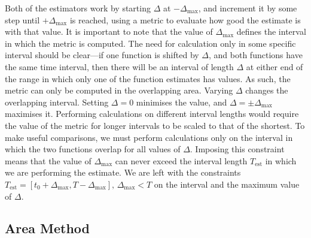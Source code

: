 \documentclass[a4paper,11pt]{article}
\begin{document}
  Both of the estimators work by starting $\Delta$ at $-\Delta_{\text{max}}$,
  and increment it by some step until $+\Delta_{\text{max}}$ is reached,
  using a metric to evaluate how good the estimate is with that value. It is
  important to note that the value of $\Delta_{\text{max}}$ defines the interval
  in which the metric is computed. The need for calculation only in some
  specific interval should be clear---if one function is shifted by $\Delta$,
  and both functions have the same time interval, then there will be an interval
  of length $\Delta$ at either end of the range in which only one of the
  function estimates has values. As such, the metric can only be computed in the
  overlapping area. Varying $\Delta$ changes the overlapping interval. Setting
  $\Delta=0$ minimises the value, and $\Delta=\pm\Delta_{\text{max}}$ maximises
  it. Performing calculations on different interval lengths would require the
  value of the metric for longer intervals to be scaled to that of the
  shortest. To make useful comparisons, we must perform calculations only on the
  interval in which the two functions overlap for all values of
  $\Delta$. Imposing this constraint means that the value of
  $\Delta_{\text{max}}$ can never exceed the interval length $T_{\text{est}}$ in which we are
  performing the estimate. We are left with the constraints
  $T_{\text{est}}=[t_0+\Delta_{\text{max}},
  T-\Delta_{\text{max}}],\,\Delta_{\text{max}}<T$ on the interval and the
  maximum value of $\Delta$.
\subsection{Area Method}
\label{sec-5-1}
\end{document}
